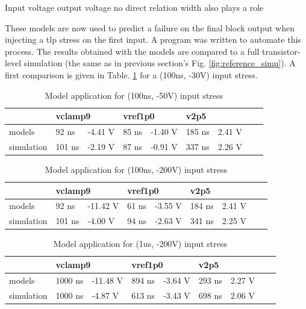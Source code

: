 Input voltage output voltage no direct relation
width also plays a role

These models are now used to predict a failure on the final block output when injecting a \gls{tlp} stress on the first input.
A program was written to automate this process.
The results obtained with the models are compared to a full transistor-level simulation (the same as in previous section's Fig. \ref{fig:reference_simu}).
A first comparison is given in Table. \ref{tab:model-v2-vs-sim} for a (100ns, -30V) input stress.

\begin{table}[!h]
\centering
\begin{tabular}{@{}lllllllll@{}}
           & \multicolumn{2}{l}{vclamp9} & \multicolumn{2}{l}{vref1p0} & \multicolumn{2}{l}{v2p5} \\
\toprule
models     & 92 ns      & -4.41 V        & 85 ns       & -1.40 V       & 185 ns      & 2.41 V     \\
simulation & 101 ns     & -2.19 V        & 87 ns       & -0.91 V       & 337 ns      & 2.26 V
\end{tabular}
\caption{Model application for (100ns, -50V) input stress}
\label{tab:model-v2-vs-sim}
\end{table}

\begin{table}[!h]
\centering
\begin{tabular}{@{}lllllllll@{}}
           & \multicolumn{2}{l}{vclamp9} & \multicolumn{2}{l}{vref1p0} & \multicolumn{2}{l}{v2p5} \\
\toprule
models     & 92 ns      & -11.42 V       & 61 ns       & -3.55 V       & 184 ns      & 2.41 V     \\
simulation & 101 ns     & -4.00 V        & 94 ns       & -2.63 V       & 341 ns      & 2.25 V
\end{tabular}
\caption{Model application for (100ns, -200V) input stress}
\label{tab:model-v2-vs-sim-2}
\end{table}

\begin{table}[!h]
\centering
\begin{tabular}{@{}lllllllll@{}}
           & \multicolumn{2}{l}{vclamp9} & \multicolumn{2}{l}{vref1p0} & \multicolumn{2}{l}{v2p5} \\
\toprule
models     & 1000 ns      & -11.48 V     & 894 ns       & -3.64 V      & 293 ns      & 2.27 V     \\
simulation & 1000 ns      & -4.87 V      & 613 ns       & -3.43 V      & 698 ns      & 2.06 V
\end{tabular}
\caption{Model application for (1us, -200V) input stress}
\label{tab:model-v2-vs-sim-3}
\end{table}

